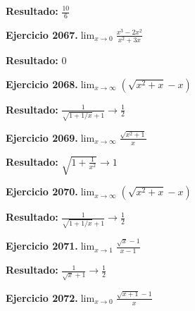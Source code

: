 \documentclass[10pt,a4paper]{article}
\begin{document}
\begin{solbox}
\textbf{Resultado:} \(\displaystyle \frac{10}{6}\)
\end{solbox}

\begin{ejbox}
\textbf{Ejercicio 2067.}\quad $\lim_{x\to 0} \frac{x^3-2x^2}{x^2+3x}$
\end{ejbox}

\begin{solbox}
\textbf{Resultado:} \(\displaystyle 0\)
\end{solbox}

\begin{ejbox}
\textbf{Ejercicio 2068.}\quad $\lim_{x\to \infty} (\sqrt{x^2+x} - x)$
\end{ejbox}

\begin{solbox}
\textbf{Resultado:} \(\displaystyle \frac{1}{\sqrt{1+1/x}+1} \to \frac{1}{2}\)
\end{solbox}

\newpage
\begin{ejbox}
\textbf{Ejercicio 2069.}\quad $\lim_{x\to \infty} \frac{\sqrt{x^2+1}}{x}$
\end{ejbox}

\begin{solbox}
\textbf{Resultado:} \(\displaystyle \sqrt{1+\frac{1}{x^2}} \to 1\)
\end{solbox}

\begin{ejbox}
\textbf{Ejercicio 2070.}\quad $\lim_{x\to \infty} (\sqrt{x^2+x} - x)$
\end{ejbox}

\begin{solbox}
\textbf{Resultado:} \(\displaystyle \frac{1}{\sqrt{1+1/x}+1} \to \frac{1}{2}\)
\end{solbox}

\begin{ejbox}
\textbf{Ejercicio 2071.}\quad $\lim_{x\to 1} \frac{\sqrt{x}-1}{x-1}$
\end{ejbox}

\begin{solbox}
\textbf{Resultado:} \(\displaystyle \frac{1}{\sqrt{x}+1} \to \frac{1}{2}\)
\end{solbox}

\newpage
\begin{ejbox}
\textbf{Ejercicio 2072.}\quad $\lim_{x\to 0} \frac{\sqrt{x+1}-1}{x}$
\end{ejbox}
\end{document}
